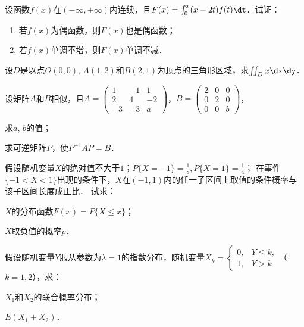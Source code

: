 \documentclass[plain,noanswer,medmath]{../../template/jnuexam}
\begin{document}

\begin{problem}
设函数$f(x)$在$(-\infty , +\infty)$内连续，且$F(x) = \int_0^x (x - 2t) f(t)\dt$．试证：
\begin{enumerate}
\item 若$f(x)$为偶函数，则$F(x)$也是偶函数；
\item 若$f(x)$单调不增，则$F(x)$单调不减．
\end{enumerate}
\end{problem}



\begin{problem}
设$D$是以点$O(0,0)$, $A(1,2)$和$B(2,1)$为顶点的三角形区域，求$\iint_Dx\dx\dy$．
\end{problem}






\begin{problem}
设矩阵$A$和$B$相似，且$A = \begin{pmatrix}
    1 & - 1 & 1 \\
    2 &   4 & - 2 \\
  - 3 & - 3 & a
\end{pmatrix}$，$B = \begin{pmatrix}
  2 & 0 & 0 \\
  0 & 2 & 0 \\
  0 & 0 & b
\end{pmatrix}$，\par
\begin{enumerate*}
\item 求$a$, $b$的值；
\item 求可逆矩阵$P$，使$P^{-1} AP = B$．
\end{enumerate*}
\end{problem}



\begin{problem}
假设随机变量$X$的绝对值不大于$1$；$P\{X = - 1\} = \frac{1}{8},P\{X = 1\} = \frac{1}{4}$；
在事件$\{- 1 < X < 1\}$出现的条件下，$X$在$(- 1,1)$内的任一子区间上取值的条件概率与该子区间长度成正比．
试求：\par
\begin{enumerate*}
\item $X$的分布函数$F(x) = P\{X \le x\}$；
\item $X$取负值的概率$p$．
\end{enumerate*}
\end{problem}



\begin{problem}
假设随机变量$Y$服从参数为$\lambda = 1$的指数分布，随机变量$X_k = \begin{cases}
  0, & Y \le k, \\
  1, & Y > k
\end{cases}$（$k = 1,2$），求：
\begin{enumerate*}
\item $X_1$和$X_2$的联合概率分布；
\item $E(X_1 + X_2)$．
\end{enumerate*}
\end{problem}
\end{document}

